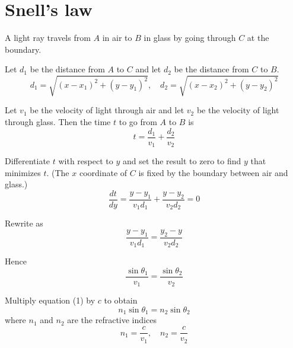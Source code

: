 

\section*{Snell's law}

A light ray travels from $A$ in air to $B$ in glass by going through $C$
at the boundary.

\begin{center}
\end{center}

Let $d_1$ be the distance from $A$ to $C$ and let $d_2$ be the distance from $C$ to $B$.
\begin{equation*}
d_1=\sqrt{(x-x_1)^2+(y-y_1)^2},
\quad
d_2=\sqrt{(x-x_2)^2+(y-y_2)^2}
\end{equation*}

Let $v_1$ be the velocity of light through air and let $v_2$ be the velocity of light through glass.
Then the time $t$ to go from $A$ to $B$ is
\begin{equation*}
t=\frac{d_1}{v_1}+\frac{d_2}{v_2}
\end{equation*}

Differentiate $t$ with respect to $y$ and set the result to zero to find $y$ that minimizes $t$.
(The $x$ coordinate of $C$ is fixed by the boundary between air and glass.)
\begin{equation*}
\frac{dt}{dy}=\frac{y-y_1}{v_1d_1}+\frac{y-y_2}{v_2d_2}=0
\end{equation*}

Rewrite as
\begin{equation*}
\frac{y-y_1}{v_1d_1}=\frac{y_2-y}{v_2d_2}
\end{equation*}

Hence
\begin{equation*}
\frac{\sin\theta_1}{v_1}=\frac{\sin\theta_2}{v_2}
\tag{1}
\end{equation*}

Multiply equation (1) by $c$ to obtain
\begin{equation*}
n_1\sin\theta_1=n_2\sin\theta_2
\end{equation*}
where $n_1$ and $n_2$ are the refractive indices
\begin{equation*}
n_1=\frac{c}{v_1},
\quad n_2=\frac{c}{v_2}
\end{equation*}


